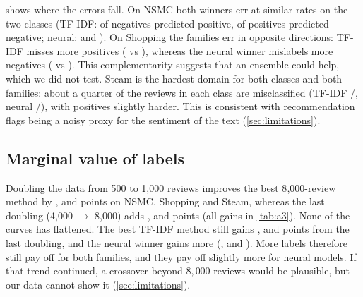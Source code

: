  shows where the errors fall. On NSMC both winners err at similar
rates on the two classes (TF-IDF: \fprTfidfNSMC{} of negatives predicted positive,
\fnrTfidfNSMC{} of positives predicted negative; neural: \fprNeuralNSMC{} and
\fnrNeuralNSMC). On Shopping the families err in opposite directions: TF-IDF misses more
positives (\fnrTfidfShopping{} vs \fprTfidfShopping), whereas the neural winner
mislabels more negatives (\fprNeuralShopping{} vs \fnrNeuralShopping). This
complementarity suggests that an ensemble could help, which we did not test. Steam is the
hardest domain for both classes and both families: about a quarter of the reviews in
each class are misclassified (TF-IDF \fprTfidfSteam/\fnrTfidfSteam, neural
\fprNeuralSteam/\fnrNeuralSteam), with positives slightly harder. This is consistent with
recommendation flags being a noisy proxy for the sentiment of the text (\cref{sec:limitations}).

\subsection{Marginal value of labels}
\label{sec:marginal}
Doubling the data from 500 to 1{,}000 reviews improves the best 8{,}000-review method by
\gainFirstNSMC, \gainFirstShopping{} and \gainFirstSteam{} points on NSMC, Shopping and
Steam, whereas the last doubling (4{,}000 $\to$ 8{,}000) adds \gainLastNSMC,
\gainLastShopping{} and \gainLastSteam{} points (all gains in \cref{tab:a3}).
None of the curves has flattened. The best TF-IDF method still gains \gainLastNSMC,
\gainLastShopping{} and \gainLastSteam{} points from the last doubling, and the neural
winner gains more (\gainLastNeuralNSMC, \gainLastNeuralShopping{} and
\gainLastNeuralSteam). More labels therefore still pay off for both families, and they
pay off slightly more for neural models. If that trend continued, a crossover beyond
$8{,}000$ reviews would be plausible, but our data cannot show it (\cref{sec:limitations}).
